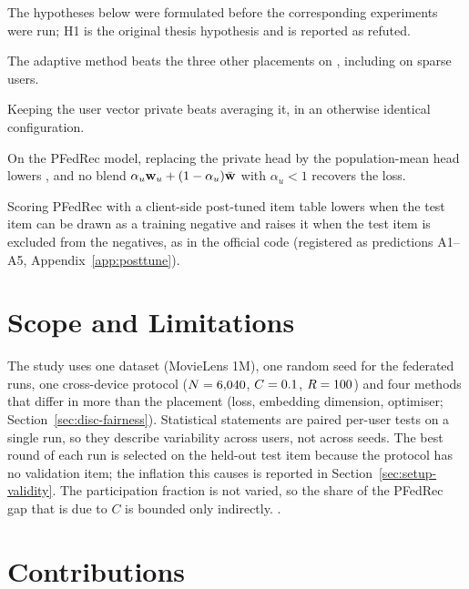 The hypotheses below were formulated before the corresponding experiments were run; H1 is the
original thesis hypothesis and is reported as refuted.

\begin{hypothesis}[H1, original]
The adaptive method beats the three other placements on \ndcg{}, including on sparse users.
\end{hypothesis}
\begin{hypothesis}[H2]
Keeping the user vector private beats averaging it, in an otherwise identical configuration.
\end{hypothesis}
\begin{hypothesis}[H3]
On the PFedRec model, replacing the private head by the population-mean head lowers \ndcg{}, and
no blend $\alpha_u \mathbf{w}_u + (1-\alpha_u)\bar{\mathbf{w}}$ with $\alpha_u<1$ recovers the loss.
\end{hypothesis}
\begin{hypothesis}[H4]
Scoring PFedRec with a client-side post-tuned item table lowers \ndcg{} when the test item can be
drawn as a training negative and raises it when the test item is excluded from the negatives, as
in the official code (registered as predictions A1--A5, Appendix~\ref{app:posttune}).
\end{hypothesis}

\section{Scope and Limitations}
\label{sec:intro-scope}

The study uses one dataset (MovieLens 1M), one random seed for the federated runs, one
cross-device protocol ($N=6{,}040$, $C=0.1$, $R=100$) and four methods that
differ in more than the placement (loss, embedding dimension, optimiser; Section~\ref{sec:disc-fairness}).
Statistical statements are paired per-user tests on a single run, so they describe variability
across users, not across seeds. The best round of each run is selected on the held-out test item
because the protocol has no validation item; the inflation this causes is reported in
Section~\ref{sec:setup-validity}. The participation fraction is not varied, so the share of the
PFedRec gap that is due to $C$ is bounded only indirectly. .

\section{Contributions}
\label{sec:intro-contributions}

